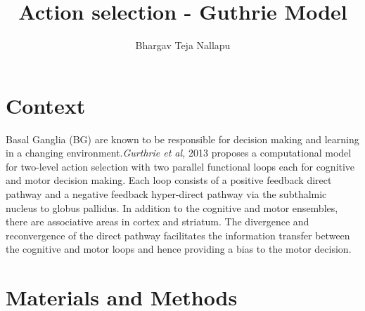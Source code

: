 \documentclass[11pt]{article}
\title{\textbf{Action selection - Guthrie Model}}
\author{Bhargav Teja Nallapu}
\begin{document}
\maketitle

\listoffigures

\section{Context}
Basal Ganglia (BG) are known to be responsible for decision making and learning in a changing environment.\emph{Gurthrie et al,} 2013 proposes a computational model for two-level action selection with two parallel functional loops each for cognitive and motor decision making. Each loop consists of a positive feedback direct pathway and a negative feedback hyper-direct pathway  via the subthalmic nucleus to globus pallidus. In addition to the cognitive and motor ensembles, there are associative areas in cortex and striatum. The divergence and reconvergence of the direct pathway facilitates the information transfer between the cognitive and motor loops and hence providing a bias to the motor decision.
\par 

\section{Materials and Methods}
\end{document}
